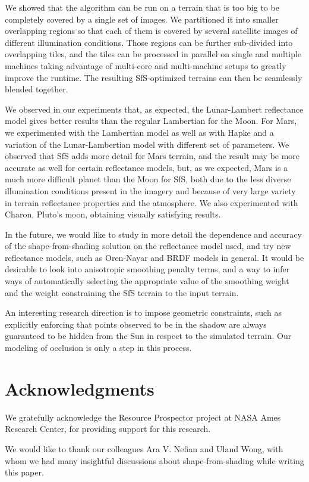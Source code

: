\documentclass[12pt,oneside]{article}
\renewcommand*{\bibname}{References}
\begin{document}
We showed that the algorithm can be run on a terrain that is too big to be
completely covered by a single set of images. We partitioned it
into smaller overlapping regions so that each of them is
covered by several satellite images of different illumination
conditions. Those regions can be further sub-divided into overlapping tiles,
and the tiles can be processed in parallel on single and multiple
machines taking advantage of multi-core and multi-machine setups
to greatly improve the runtime. The resulting SfS-optimized terrains can then be
seamlessly blended together. 

We observed in our experiments that, as expected, the Lunar-Lambert
reflectance model gives better results than the regular Lambertian for
the Moon. For Mars, we experimented with the Lambertian model as well as
with Hapke and a variation of the Lunar-Lambertian model with different
set of parameters.  We observed that SfS adds more detail for Mars
terrain, and the result may be more accurate as well for certain
reflectance models, but, as we expected, Mars is a much more difficult
planet than the Moon for SfS, both due to the less diverse illumination
conditions present in the imagery and because of very large variety in
terrain reflectance properties and the atmosphere. We also experimented
with Charon, Pluto's moon, obtaining visually satisfying results.

In the future, we would like to study in more detail the dependence and
accuracy of the shape-from-shading solution on the reflectance model
used, and try new reflectance models, such as Oren-Nayar and
BRDF models in general. It would be desirable to look into anisotropic
smoothing penalty terms, and a way to infer ways of automatically selecting the appropriate value of the
smoothing weight and the weight constraining the SfS terrain to the input terrain.

An interesting research direction is to impose geometric constraints,
such as explicitly enforcing that points observed to be in the shadow
are always guaranteed to be hidden from the Sun in respect to the
simulated terrain. Our modeling of occlusion is only a step in this
process.

\section{Acknowledgments}

We gratefully acknowledge the Resource Prospector project at NASA Ames
Research Center, for providing support for this research.

We would like to thank our colleagues Ara V. Nefian and Uland Wong, with whom we had
many insightful discussions about shape-from-shading while writing this
paper.


\addcontentsline{toc}{chapter}{\bibname}

\end{document}
